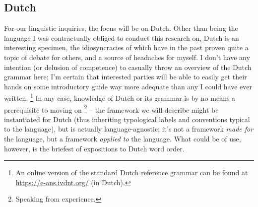 \subsection{Dutch}
For our linguistic inquiries, the focus will be on Dutch.
Other than being the language I was contractually obliged to conduct this research on, Dutch is an interesting specimen, the idiosyncracies of which have in the past proven quite a topic of debate for others, and a source of headaches for myself.
I don't have any intention (or delusion of competence) to casually throw an overview of the Dutch grammar here; I'm certain that interested parties will be able to easily get their hands on some introductory guide way more adequate than any I could have ever written.%
	\footnote{An online version of the standard Dutch reference grammar can be found at \url{https://e-ans.ivdnt.org/} (in Dutch).}
In any case, knowledge of Dutch or its grammar is by no means a prerequisite to moving on%
	\footnote{Speaking from experience.} -- the framework we will describe might be instantiated for Dutch (thus inheriting typological labels and conventions typical to the language), but is actually language-agnostic; it's not a framework \textit{made for} the language, but a framework \textit{applied to} the language.	
What could be of use, however, is the briefest of expositions to Dutch word order.

